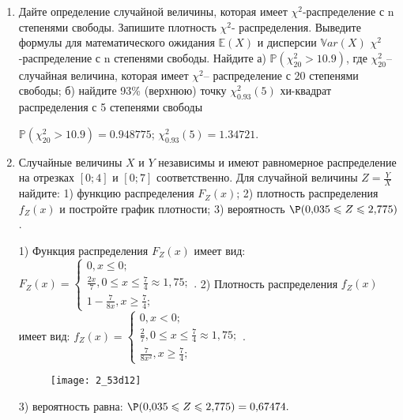 \documentclass[a4paper,12pt]{article}
\begin{document}
\begin{enumerate}


\item


Дайте определение случайной величины, которая имеет $\chi ^{2}$-распределение с n степенями свободы.
Запишите плотность $\chi ^{2}$- распределения. Выведите формулы для математического ожидания $\mathbb{E}(X)$ и дисперсии $\mathbb{V}ar(X)$ $\chi ^{2}$-распределение с n степенями свободы. Найдите а) $\mathbb{P}(\chi _{20}^{2} > 10.9)$, где $\chi _{20}^{2}$–случайная величина, которая имеет $\chi ^{2}$– распределение с 20 степенями свободы; б) найдите 93\%
(верхнюю) точку $\chi _{0.93}^{2} (5)$ хи-квадрат распределения с 5 степенями свободы




$\mathbb{P}(\chi _{20}^{2} > 10.9) =  0.948775$; $\chi _{0.93}^{2} (5) = 1.34721$.


\item



Случайные величины $X$ и $Y$ независимы и имеют равномерное
распределение на отрезках $[0;4]$ и $[0;7]$ соответственно. Для случайной величины $Z=\frac{Y}{X}$ найдите: 
1) функцию распределения $F_Z(x)$;
2) плотность распределения $f_Z(x)$ и постройте график плотности;
3) вероятность $\P(0,\!035\leqslant Z\leqslant 2,\!775)$.




1) Функция распределения $F_Z(x)$ имеет вид:
$
F_Z(x)=\left\{
\begin{array}{l}
0, x\leqslant 0;\\
\frac{2 x}{7}, 0\leqslant x\leqslant \frac{7}{4}\approx 1,\!75;\\
1 - \frac{7}{8 x}, x\geqslant\frac{7}{4};
\end{array}.
\right.
$
2) Плотность распределения $f_Z(x)$ имеет вид:
$
f_Z(x)=\left\{
\begin{array}{l}
0, x<0;\\
\frac{2}{7}, 0\leqslant x\leqslant \frac{7}{4}\approx 1,\!75;\\
\frac{7}{8 x^{2}}, x\geqslant\frac{7}{4};
\end{array}.
\right.
$


\begin{figure}[H]
    \texttt{[image: 2\_53d12]}
\end{figure}


3) вероятность равна:
$
\P(0,\!035\leqslant Z\leqslant 2,\!775)=
0,\!67474.
$



\end{enumerate}
\end{document}

